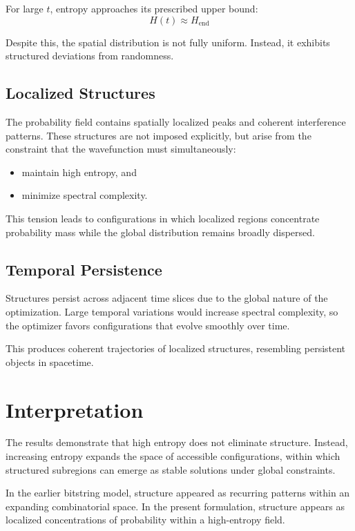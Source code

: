 \documentclass[11pt]{article}
\begin{document}
For large $t$, entropy approaches its prescribed upper bound:
\[
H(t) \approx H_{\text{end}}
\]

Despite this, the spatial distribution is not fully uniform. Instead, it exhibits structured deviations from randomness.

\subsection{Localized Structures}

The probability field contains spatially localized peaks and coherent interference patterns. These structures are not imposed explicitly, but arise from the constraint that the wavefunction must simultaneously:

\begin{itemize}
    \item maintain high entropy, and
    \item minimize spectral complexity.
\end{itemize}

This tension leads to configurations in which localized regions concentrate probability mass while the global distribution remains broadly dispersed.

\subsection{Temporal Persistence}

Structures persist across adjacent time slices due to the global nature of the optimization. Large temporal variations would increase spectral complexity, so the optimizer favors configurations that evolve smoothly over time.

This produces coherent trajectories of localized structures, resembling persistent objects in spacetime.



\section{Interpretation}

The results demonstrate that high entropy does not eliminate structure. Instead, increasing entropy expands the space of accessible configurations, within which structured subregions can emerge as stable solutions under global constraints.

In the earlier bitstring model, structure appeared as recurring patterns within an expanding combinatorial space. In the present formulation, structure appears as localized concentrations of probability within a high-entropy field.
\end{document}
